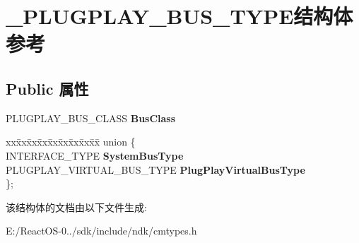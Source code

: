 \hypertarget{struct___p_l_u_g_p_l_a_y___b_u_s___t_y_p_e}{}\section{\+\_\+\+P\+L\+U\+G\+P\+L\+A\+Y\+\_\+\+B\+U\+S\+\_\+\+T\+Y\+P\+E结构体 参考}
\label{struct___p_l_u_g_p_l_a_y___b_u_s___t_y_p_e}
\subsection*{Public 属性}
\begin{DoxyCompactItemize}
\item 
\mbox{\label{struct___p_l_u_g_p_l_a_y___b_u_s___t_y_p_e_a5f2cbf3c7a39e76bd81867a7b2c51cdd}} 
P\+L\+U\+G\+P\+L\+A\+Y\+\_\+\+B\+U\+S\+\_\+\+C\+L\+A\+SS {\bfseries Bus\+Class}
\item 
\mbox{\label{struct___p_l_u_g_p_l_a_y___b_u_s___t_y_p_e_aa4353e646aa8354ac986b9e891b7052c}} 
\begin{tabbing}
xx\=xx\=xx\=xx\=xx\=xx\=xx\=xx\=xx\=\kill
union \{\\
\>INTERFACE\_TYPE {\bfseries SystemBusType}\\
\>PLUGPLAY\_VIRTUAL\_BUS\_TYPE {\bfseries PlugPlayVirtualBusType}\\
\}; \\

\end{tabbing}\end{DoxyCompactItemize}


该结构体的文档由以下文件生成\+:\begin{DoxyCompactItemize}
\item 
E\+:/\+React\+O\+S-\/0../sdk/include/ndk/cmtypes.\+h\end{DoxyCompactItemize}
